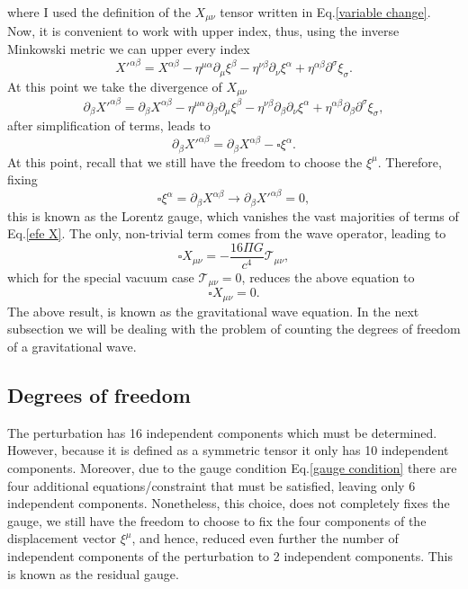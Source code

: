 \documentclass{article}
\begin{document}
where I used the definition of the $X_{\mu\nu}$ tensor written in Eq.\eqref{variable change}. 
Now, it is convenient to work with upper index, thus, using the inverse Minkowski metric we 
can upper every index
\begin{equation}
    X'^{\alpha\beta} = X^{\alpha\beta} - \eta^{\mu\alpha}\partial_{\mu}\xi^{\beta} 
    - \eta^{\nu\beta}\partial_{\nu}\xi^{\alpha} 
    + \eta^{\alpha\beta}\partial^{\sigma}\xi_{\sigma}.
\end{equation}
At this point we take the divergence of $X_{\mu\nu}$
\begin{equation}
    \partial_{\beta}X'^{\alpha\beta} = \partial_{\beta}X^{\alpha\beta}
    - \eta^{\mu\alpha}\partial_{\beta}\partial_{\mu}\xi^{\beta} 
    - \eta^{\nu\beta}\partial_{\beta}\partial_{\nu}\xi^{\alpha} 
    + \eta^{\alpha\beta}\partial_{\beta}\partial^{\sigma}\xi_{\sigma},
\end{equation}
after simplification of terms, leads to
\begin{equation}
    \partial_{\beta}X'^{\alpha\beta} = \partial_{\beta}X^{\alpha\beta}
    - \square \xi^{\alpha}.
\end{equation}
At this point, recall that we still have the freedom to choose the $\xi^{\mu}$. Therefore,
fixing 
\begin{equation}
    \label{gauge condition}
    \square \xi^{\alpha} = \partial_{\beta}X^{\alpha\beta} 
    \rightarrow \partial_{\beta}X'^{\alpha\beta} = 0,
\end{equation}
this is known as the Lorentz gauge, which vanishes the vast majorities of 
terms of Eq.\eqref{efe X}. The only, non-trivial term comes from the wave 
operator, leading to
\begin{equation}
    \square X_{\mu\nu} = -\frac{16\Pi G}{c^4}\mathcal{T}_{\mu\nu},
\end{equation}
which for the special vacuum case $\mathcal{T}_{\mu\nu} = 0$, reduces the 
above equation to 
\begin{equation}
    \square X_{\mu\nu} = 0.
\end{equation}
The above result, is known as the gravitational wave equation. In the next subsection we will
be dealing with the problem of counting the degrees of freedom of a gravitational wave.

\subsection{Degrees of freedom}

The perturbation has 16 independent components which must be determined. 
However, because it is defined as a symmetric tensor it only has 10 
independent components. Moreover, due to the gauge condition 
Eq.\eqref{gauge condition} there are four additional equations/constraint 
that must be satisfied, leaving only 6 independent components. Nonetheless, 
this choice, does not completely fixes the gauge, we still have the freedom 
to choose to fix the four components of the displacement vector $\xi^{\mu}$, 
and hence, reduced even further the number of independent components of the 
perturbation to 2 independent components. This is known as the residual gauge.
\end{document}
